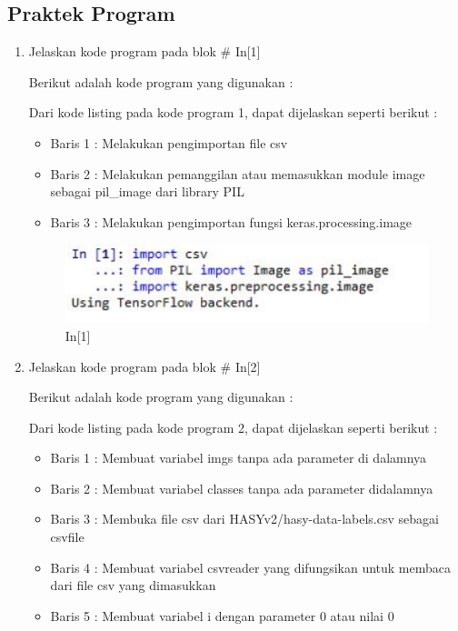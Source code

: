 \subsection{Praktek Program}
\begin{enumerate}
\item Jelaskan kode program pada blok \# In[1]
\par Berikut adalah kode program yang digunakan :

\par Dari kode listing pada kode program 1, dapat dijelaskan seperti berikut :
\begin{itemize}
\item Baris 1	: Melakukan pengimportan file csv
\item Baris 2	: Melakukan pemanggilan atau memasukkan module image sebagai pil\_image dari library PIL
\item Baris 3	: Melakukan pengimportan fungsi keras.processing.image 
\end{itemize}
\begin{figure}[!htbp]
	\centerline{\includegraphics[width=1\textwidth]{figures/andi/p1.PNG}}
	\caption{In[1]}
\end{figure}
\item Jelaskan kode program pada blok \# In[2]
\par Berikut adalah kode program yang digunakan :

\par Dari kode listing pada kode program 2, dapat dijelaskan seperti berikut :
\begin{itemize}
\item Baris 1	: Membuat variabel imgs tanpa ada parameter di dalamnya
\item Baris 2	: Membuat variabel classes tanpa ada parameter didalamnya
\item Baris 3	: Membuka file csv dari HASYv2/hasy-data-labels.csv sebagai csvfile
\item Baris 4	: Membuat variabel csvreader yang difungsikan untuk membaca dari file csv yang dimasukkan
\item Baris 5	: Membuat variabel i dengan parameter 0 atau nilai 0

\end{itemize}
\end{enumerate}

